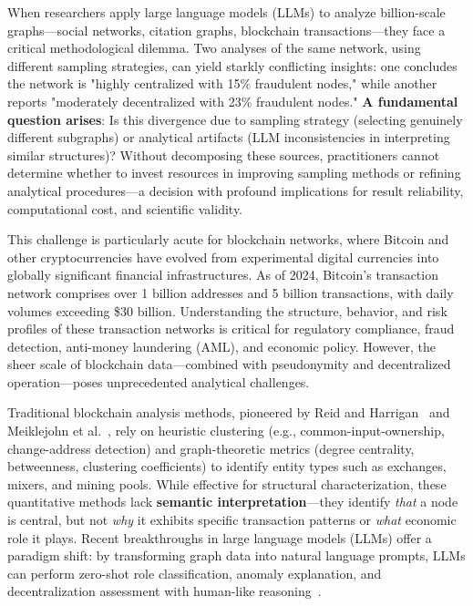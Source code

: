 \documentclass[conference]{IEEEtran}
\begin{document}
When researchers apply large language models (LLMs) to analyze billion-scale graphs---social networks, citation graphs, blockchain transactions---they face a critical methodological dilemma. Two analyses of the same network, using different sampling strategies, can yield starkly conflicting insights: one concludes the network is "highly centralized with 15\% fraudulent nodes," while another reports "moderately decentralized with 23\% fraudulent nodes." \textbf{A fundamental question arises}: Is this divergence due to sampling strategy (selecting genuinely different subgraphs) or analytical artifacts (LLM inconsistencies in interpreting similar structures)? Without decomposing these sources, practitioners cannot determine whether to invest resources in improving sampling methods or refining analytical procedures---a decision with profound implications for result reliability, computational cost, and scientific validity.


This challenge is particularly acute for blockchain networks, where Bitcoin and other cryptocurrencies have evolved from experimental digital currencies into globally significant financial infrastructures. As of 2024, Bitcoin's transaction network comprises over 1 billion addresses and 5 billion transactions, with daily volumes exceeding \$30 billion. Understanding the structure, behavior, and risk profiles of these transaction networks is critical for regulatory compliance, fraud detection, anti-money laundering (AML), and economic policy. However, the sheer scale of blockchain data---combined with pseudonymity and decentralized operation---poses unprecedented analytical challenges.

Traditional blockchain analysis methods, pioneered by Reid and Harrigan~\cite{reid2011} and Meiklejohn et al.~\cite{meiklejohn2013fistful}, rely on heuristic clustering (e.g., common-input-ownership, change-address detection) and graph-theoretic metrics (degree centrality, betweenness, clustering coefficients) to identify entity types such as exchanges, mixers, and mining pools. While effective for structural characterization, these quantitative methods lack \textbf{semantic interpretation}---they identify \textit{that} a node is central, but not \textit{why} it exhibits specific transaction patterns or \textit{what} economic role it plays. Recent breakthroughs in large language models (LLMs) offer a paradigm shift: by transforming graph data into natural language prompts, LLMs can perform zero-shot role classification, anomaly explanation, and decentralization assessment with human-like reasoning~\cite{lei2025llm}.
\end{document}
